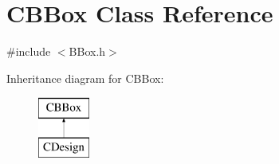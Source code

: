 \hypertarget{classCBBox}{}\section{C\+B\+Box Class Reference}
\label{classCBBox}


{\ttfamily \#include $<$B\+Box.\+h$>$}

Inheritance diagram for C\+B\+Box\+:\begin{figure}[H]
\begin{center}
\leavevmode
\includegraphics[height=2.000000cm]{classCBBox}
\end{center}
\end{figure}
